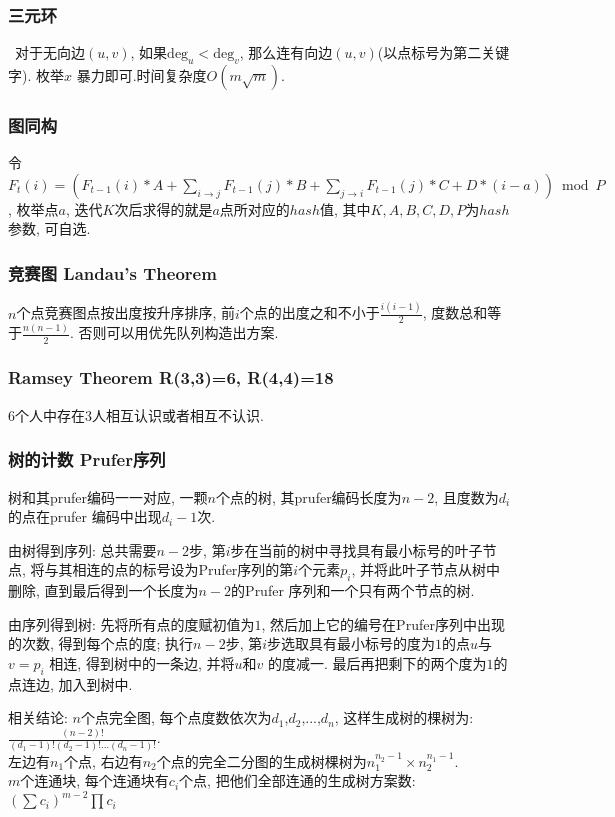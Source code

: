 \subsubsection{三元环}\
               对于无向边$(u,v)$, 如果$\mathrm{deg}_u<\mathrm{deg}_v$, 那么连有向边$(u,v)$(以点标号为第二关键字). 枚举$x$ 暴力即可.时间复杂度$O(m\sqrt{m})$. 
\subsubsection{图同构}
                令$F_t(i)=(F_{t-1}(i)*A+\sum_{i\to j} F_{t-1}(j)*B+\sum_{j\to i} F_{t-1}(j)*C+D*(i-a)) \bmod P$, 枚举点$a$, 迭代$K$次后求得的就是$a$点所对应的$hash$值, 其中$K,A,B,C,D,P$为$hash$参数, 可自选. 

\subsubsection{竞赛图 Landau's Theorem}
    $n$个点竞赛图点按出度按升序排序, 前$i$个点的出度之和不小于$\frac{i(i-1)}{2}$, 度数总和等于$\frac{n(n-1)}{2}$. 否则可以用优先队列构造出方案.

\subsubsection{Ramsey Theorem R(3,3)=6, R(4,4)=18}
    $6$个人中存在$3$人相互认识或者相互不认识.

\subsubsection{树的计数 Prufer序列}
    树和其prufer编码一一对应, 一颗$n$个点的树, 其prufer编码长度为${n-2}$, 且度数为$d_i$ 的点在prufer 编码中出现${d_i -1}$次. 
    \par 由树得到序列: 总共需要$n-2$步, 第$i$步在当前的树中寻找具有最小标号的叶子节点, 将与其相连的点的标号设为Prufer序列的第$i$个元素$p_i$, 并将此叶子节点从树中删除, 直到最后得到一个长度为$n-2$的Prufer 序列和一个只有两个节点的树. 
    \par 由序列得到树: 先将所有点的度赋初值为$1$, 然后加上它的编号在Prufer序列中出现的次数, 得到每个点的度; 执行$n-2$步, 第$i$步选取具有最小标号的度为$1$的点$u$与$v=p_i$ 相连, 得到树中的一条边, 并将$u$和$v$ 的度减一. 最后再把剩下的两个度为$1$的点连边, 加入到树中. 
    \par 相关结论: $n$个点完全图, 每个点度数依次为$d_1$,$d_2$,...,$d_n$, 这样生成树的棵树为: ${\frac{(n-2)!}{(d_1-1)!(d_2-1)!...(d_n-1)!}}$.\\
    左边有$n_1$个点, 右边有$n_2$个点的完全二分图的生成树棵树为$n_1^{n_2-1}\times n_2^{n_1-1}$. \\
    $m$个连通块, 每个连通块有$c_i$个点, 把他们全部连通的生成树方案数: $(\sum c_i)^{m-2}\prod c_i$
